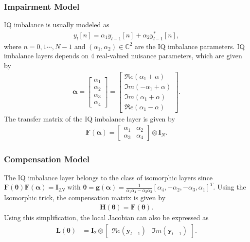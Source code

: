 \documentclass{article}
\begin{document}
\subsubsection{Impairment Model}
IQ imbalance is usually modeled as \cite{VAL01,TAR05}
\begin{align}
y_l[n] = \alpha_1 y_{l-1}[n]+ \alpha_2 y_{l-1}^*[n],
\end{align}
where $n=0,1\cdots,N-1$ and $(\alpha_1,\alpha_2) \in \mathbb{C}^2$ are the IQ imbalance parameters. IQ imbalance layers depends on $4$ real-valued nuisance parameters, which are given by
\begin{align}
\boldsymbol \alpha =
\begin{bmatrix}
\alpha_1\\
\alpha_2\\
\alpha_3\\
\alpha_4
\end{bmatrix}=
\begin{bmatrix}
\Re e(\alpha_1+\alpha)\\
\Im m(-\alpha_1+\alpha)\\
\Im m(\alpha_1+\alpha)\\
\Re e(\alpha_1-\alpha)
\end{bmatrix}.
\end{align}
The transfer matrix of the IQ imbalance layer is given by
\begin{align}
\mathbf{F}(\boldsymbol \alpha)=\begin{bmatrix}
\alpha_1& \alpha_2\\
\alpha_3&\alpha_4
\end{bmatrix} \otimes \mathbf{I}_N\label{eqiq}.
\end{align}

\subsubsection{Compensation Model}
The IQ imbalance layer belongs to the class of isomorphic layers since $
\mathbf{F}(\boldsymbol \theta)\mathbf{F}(\boldsymbol \alpha)=\mathbf{I}_{2N}$ with
$\boldsymbol \theta=\mathbf{g}(\boldsymbol \alpha)=\frac{1}{\alpha_1\alpha_4-\alpha_2\alpha_3}\left[\alpha_4,-\alpha_2,-\alpha_3,\alpha_1\right]^T$. Using the Isomorphic trick, the compensation matrix is given by
\begin{align}
\mathbf{H}(\boldsymbol \theta)=\mathbf{F}(\boldsymbol \theta).
\end{align}
Using this simplification, the local Jacobian can also be expressed as 
\begin{align}
\mathbf{L}(\boldsymbol \theta)&=
\mathbf{I}_2 \otimes
\begin{bmatrix}\Re e(\mathbf{y}_{l-1})&\Im m(\mathbf{y}_{l-1})\end{bmatrix}.
\end{align}
\end{document}
